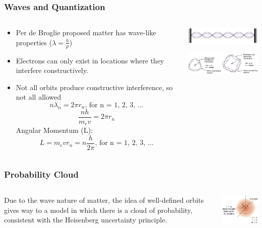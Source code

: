 \documentclass{beamer}
\begin{document}
\begin{frame}\frametitle{Waves and Quantization}
\begin{columns}
\begin{column}{6.5cm}
\begin{itemize}
\item Per de Broglie proposed matter has wave-like properties ($\lambda = \frac{h}{p}$)
\item Electrons can only exist in locations where they interfere constructively.
\item Not all orbits produce constructive interference, so not all allowed
\[ n \lambda_n = 2 \pi r_n \text{, for n = 1, 2, 3, ...} \]
\[ \frac{nh}{m_e v} = 2 \pi r_n \]
Angular Momentum (L):
\[ L = m_e v r_n = n \frac{h}{2 \pi}  \text{, for n = 1, 2, 3, ...} \]
\end{itemize}
\end{column}
\begin{column}{5cm}
\begin{center}
\includegraphics[width=5cm]{fig/bohr1.jpg}

\vspace{1cm}

\includegraphics[width=5cm]{fig/bohr2.jpg}
\end{center}
\end{column}
\end{columns}
\end{frame}

\begin{frame}\frametitle{Probability Cloud}
\begin{columns}
\begin{column}{6.5cm}
Due to the wave nature of matter, the idea of well-defined orbits gives way to a model in which there is a cloud of probability, consistent with the Heisenberg uncertainty principle. 
\end{column}
\begin{column}{5cm}
\begin{center}
\includegraphics[width=5cm]{fig/schrodenger1.jpg}
\end{center}
\end{column}
\end{columns}
\end{frame}
\end{document}
